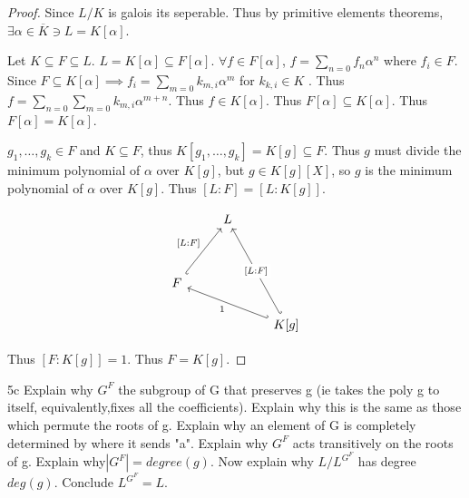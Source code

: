 \documentclass{article}
\begin{document}
\begin{proof}
    Since $L / K$ is galois its seperable. Thus by primitive elements theorems, $\exists \alpha \in \overline{K} \ni L = K[\alpha]$. 
    
    Let $K \subseteq F \subseteq L$. $L = K[\alpha] \subseteq F[\alpha]$. $\forall f \in F[\alpha]$, $f = \sum_{n = 0} f_n \alpha^n$ where $f_i \in F$. Since $F \subseteq K[\alpha] \implies f_i = \sum_{m = 0} k_{m, i} \alpha^m$ for $k_{k, i } \in K$ . Thus $f = \sum_{n = 0} \sum_{m = 0} k_{m, i} \alpha^{m + n}$. Thus $f \in K[\alpha]$. Thus $F[\alpha] \subseteq K[\alpha]$. Thus $F[\alpha] = K[\alpha]$.
    
    $g_1, \dots, g_k \in F$ and $K \subseteq F$, thus $K[g_1, \dots, g_k] = K[g] \subseteq F$. Thus $g$ must divide the minimum polynomial of $\alpha$ over $K[g]$, but $g \in K[g][X]$, so $g$ is the minimum polynomial of $\alpha$ over $K[g]$. Thus $[L : F] = [L : K[g]]$. 
    
    \[\begin{tikzcd}
        & L \\
        \\
        F \\
        && {K[g]}
        \arrow["1", hook', from=4-3, to=3-1]
        \arrow["{[L:F]}"{description}, hook', from=4-3, to=1-2]
        \arrow["{[L:F]}", hook', from=3-1, to=1-2]
    \end{tikzcd}\]

    Thus $[F: K[g]] = 1$. Thus $F = K[g]$.  
\end{proof}
\begin{PROB}{5c}\label{Problem 5c.}
    Explain why $G^F$ the subgroup of G that preserves g (ie takes the poly g to itself, equivalently,fixes all the coefficients). Explain why this is the same as those which permute the roots of g. Explain why an element of G is completely determined by where it sends "a". Explain why $G^F$ acts transitively on the roots of g. Explain why$ |G^F| = degree(g)$.  Now explain why $L/ L^{G^F}$ has degree  $deg(g)$. Conclude $L^{G^F} = L$. 
\end{PROB}
\end{document}
